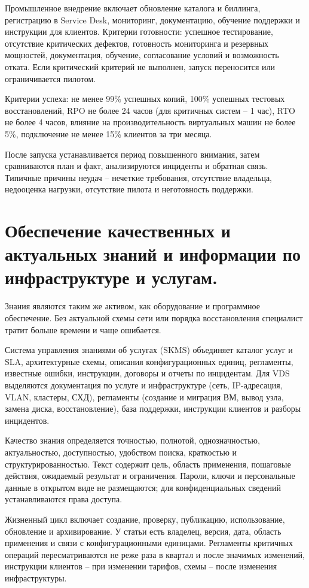 \documentclass[14pt,a4paper]{extarticle}
\begin{document}
Промышленное внедрение включает обновление каталога и биллинга, регистрацию в
Service Desk, мониторинг, документацию, обучение поддержки и инструкции для
клиентов. Критерии готовности: успешное тестирование, отсутствие критических
дефектов, готовность мониторинга и резервных мощностей, документация, обучение,
согласование условий и возможность отката. Если критический критерий не выполнен,
запуск переносится или ограничивается пилотом.

Критерии успеха: не менее 99\% успешных копий, 100\% успешных тестовых
восстановлений, RPO не более 24 часов (для критичных систем -- 1 час), RTO не
более 4 часов, влияние на производительность виртуальных машин не более 5\%,
подключение не менее 15\% клиентов за три месяца.

После запуска устанавливается период повышенного внимания, затем сравниваются
план и факт, анализируются инциденты и обратная связь. Типичные причины неудач --
нечеткие требования, отсутствие владельца, недооценка нагрузки, отсутствие пилота
и неготовность поддержки.

\section{Обеспечение качественных и актуальных знаний и информации по инфраструктуре и услугам.}

Знания являются таким же активом, как оборудование и программное обеспечение.
Без актуальной схемы сети или порядка восстановления специалист тратит больше
времени и чаще ошибается.

Система управления знаниями об услугах (SKMS) объединяет каталог услуг и SLA,
архитектурные схемы, описания конфигурационных единиц, регламенты, известные
ошибки, инструкции, договоры и отчеты по инцидентам. Для VDS выделяются
документация по услуге и инфраструктуре (сеть, IP-адресация, VLAN, кластеры,
СХД), регламенты (создание и миграция ВМ, вывод узла, замена диска,
восстановление), база поддержки, инструкции клиентов и разборы инцидентов.

Качество знания определяется точностью, полнотой, однозначностью, актуальностью,
доступностью, удобством поиска, краткостью и структурированностью. Текст
содержит цель, область применения, пошаговые действия, ожидаемый результат и
ограничения. Пароли, ключи и персональные данные в открытом виде не размещаются;
для конфиденциальных сведений устанавливаются права доступа.

Жизненный цикл включает создание, проверку, публикацию, использование,
обновление и архивирование. У статьи есть владелец, версия, дата, область
применения и связи с конфигурационными единицами. Регламенты критичных операций
пересматриваются не реже раза в квартал и после значимых изменений, инструкции
клиентов -- при изменении тарифов, схемы -- после изменения инфраструктуры.
\end{document}

